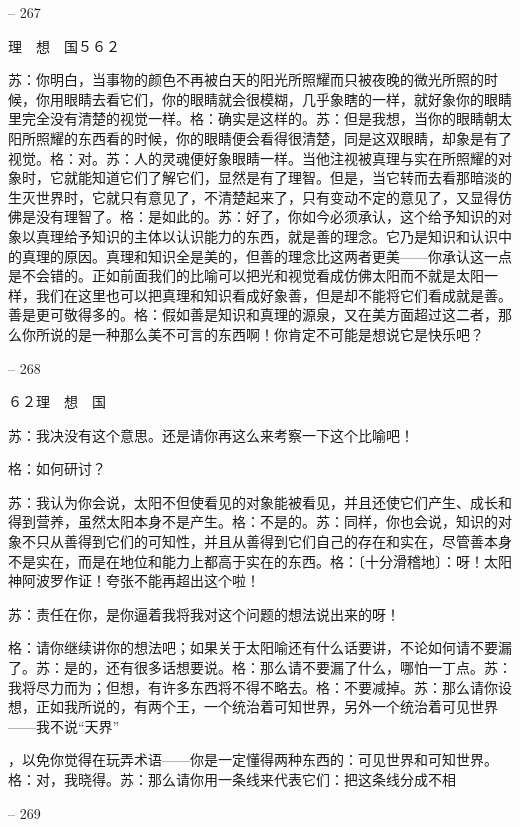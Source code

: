 \documentclass[11pt,oneside]{book}
\begin{document}
\begin{common-format}
    

-- 267

    理　想　国５６２

    苏：你明白，当事物的颜色不再被白天的阳光所照耀而只被夜晚的微光所照的时候，你用眼睛去看它们，你的眼睛就会很模糊，几乎象瞎的一样，就好象你的眼睛里完全没有清楚的视觉一样。格：确实是这样的。苏：但是我想，当你的眼睛朝太阳所照耀的东西看的时候，你的眼睛便会看得很清楚，同是这双眼睛，却象是有了视觉。格：对。苏：人的灵魂便好象眼睛一样。当他注视被真理与实在所照耀的对象时，它就能知道它们了解它们，显然是有了理智。但是，当它转而去看那暗淡的生灭世界时，它就只有意见了，不清楚起来了，只有变动不定的意见了，又显得仿佛是没有理智了。格：是如此的。苏：好了，你如今必须承认，这个给予知识的对象以真理给予知识的主体以认识能力的东西，就是善的理念。它乃是知识和认识中的真理的原因。真理和知识全是美的，但善的理念比这两者更美——你承认这一点是不会错的。正如前面我们的比喻可以把光和视觉看成仿佛太阳而不就是太阳一样，我们在这里也可以把真理和知识看成好象善，但是却不能将它们看成就是善。善是更可敬得多的。格：假如善是知识和真理的源泉，又在美方面超过这二者，那么你所说的是一种那么美不可言的东西啊！你肯定不可能是想说它是快乐吧？

    

-- 268

    ６２理　想　国

    苏：我决没有这个意思。还是请你再这么来考察一下这个比喻吧！

    格：如何研讨？

    苏：我认为你会说，太阳不但使看见的对象能被看见，并且还使它们产生、成长和得到营养，虽然太阳本身不是产生。格：不是的。苏：同样，你也会说，知识的对象不只从善得到它们的可知性，并且从善得到它们自己的存在和实在，尽管善本身不是实在，而是在地位和能力上都高于实在的东西。格：〔十分滑稽地〕：呀！太阳神阿波罗作证！夸张不能再超出这个啦！

    苏：责任在你，是你逼着我将我对这个问题的想法说出来的呀！

    格：请你继续讲你的想法吧；如果关于太阳喻还有什么话要讲，不论如何请不要漏了。苏：是的，还有很多话想要说。格：那么请不要漏了什么，哪怕一丁点。苏：我将尽力而为；但想，有许多东西将不得不略去。格：不要减掉。苏：那么请你设想，正如我所说的，有两个王，一个统治着可知世界，另外一个统治着可见世界——我不说“天界”

    ，以免你觉得在玩弄术语——你是一定懂得两种东西的：可见世界和可知世界。格：对，我晓得。苏：那么请你用一条线来代表它们：把这条线分成不相

    

-- 269


\end{common-format}
\end{document}
